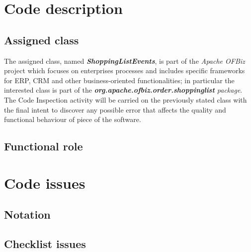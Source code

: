 \documentclass[11pt,a4paper]{report}
\begin{document}


\thispagestyle{empty}
\tableofcontents
\cleardoublepage
{}
\pagestyle{fancy}

\chapter{Code description}
\section{Assigned class}
The assigned class, named \textbf{\textit{ShoppingListEvents}}, is part of the \textit{Apache OFBiz} project which focuses on enterprises processes and includes specific frameworks for ERP, CRM and other business-oriented functionalities;
in particular the interested class is part of the \textit{\textbf{org.apache.ofbiz.order.shoppinglist} package}.\\
The Code Inspection activity will be carried on the previously stated class with the final intent to discover any possible error that affects the quality and functional behaviour of piece of the software.
\section{Functional role}
\chapter{Code issues}
\section{Notation}
\section{Checklist issues}
\end{document}
